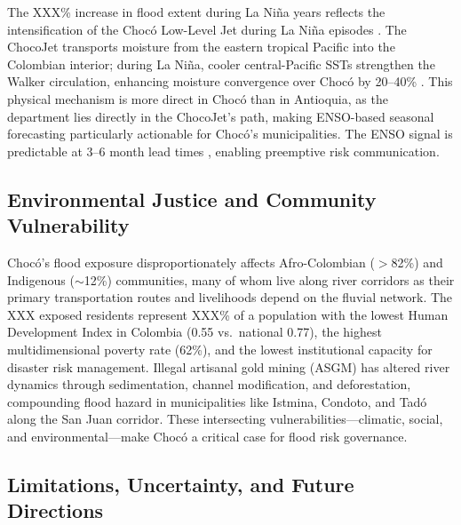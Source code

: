 \documentclass{article}
\begin{document}
The XXX\% increase in flood extent during La Ni\~na years reflects the intensification of the Choc\'o Low-Level Jet during La Ni\~na episodes \citep{Poveda2023, Salas2023, Mejia2021}. The ChocoJet transports moisture from the eastern tropical Pacific into the Colombian interior; during La Ni\~na, cooler central-Pacific SSTs strengthen the Walker circulation, enhancing moisture convergence over Choc\'o by 20--40\% \citep{Poveda2001}. This physical mechanism is more direct in Choc\'o than in Antioquia, as the department lies directly in the ChocoJet's path, making ENSO-based seasonal forecasting particularly actionable for Choc\'o's municipalities. The ENSO signal is predictable at 3--6 month lead times \citep{Tippett2012}, enabling preemptive risk communication.

\subsection{Environmental Justice and Community Vulnerability}

Choc\'o's flood exposure disproportionately affects Afro-Colombian ($>$82\%) and Indigenous ($\sim$12\%) communities, many of whom live along river corridors as their primary transportation routes and livelihoods depend on the fluvial network. The XXX exposed residents represent XXX\% of a population with the lowest Human Development Index in Colombia (0.55 vs.\ national 0.77), the highest multidimensional poverty rate (62\%), and the lowest institutional capacity for disaster risk management. Illegal artisanal gold mining (ASGM) has altered river dynamics through sedimentation, channel modification, and deforestation, compounding flood hazard in municipalities like Istmina, Condoto, and Tad\'o along the San Juan corridor. These intersecting vulnerabilities---climatic, social, and environmental---make Choc\'o a critical case for flood risk governance.

\subsection{Limitations, Uncertainty, and Future Directions}
\label{sec:limitations}
\end{document}
